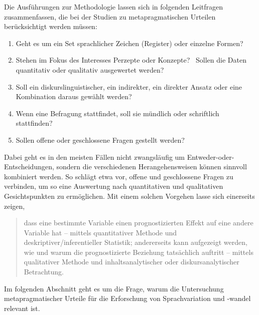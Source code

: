 Die Ausführungen zur Methodologie lassen sich in folgenden Leitfragen zusammenfassen, die bei der Studien zu metapragmatischen Urteilen berücksichtigt werden müssen:
\begin{enumerate}
\item Geht es um ein Set sprachlicher Zeichen (Register) oder einzelne Formen?
\item Stehen im Fokus des Interesses Perzepte oder Konzepte? 
\ Sollen die Daten quantitativ oder qualitativ ausgewertet werden? 
\item Soll ein diskurslinguistischer, ein indirekter, ein direkter Ansatz oder eine Kombination daraus gewählt werden? 
\item Wenn eine Befragung stattfindet, soll sie mündlich oder schriftlich stattfinden? 
\item Sollen offene oder geschlossene Fragen gestellt werden? 
\end{enumerate} 
Dabei geht es in den meisten Fällen nicht zwangsläufig um Entweder\hyp oder\hyp Entscheidungen, sondern die verschiedenen Herangehensweisen können sinnvoll kombiniert werden. 
So schlägt etwa \citet[179]{Studler.2014} vor, offene und geschlossene Fragen zu verbinden, um so eine Auswertung nach quantitativen und qualitativen Gesichtspunkten zu ermöglichen. 
Mit einem solchen Vorgehen lasse sich einerseits zeigen, 
\begin{quote}dass eine bestimmte Variable einen prognostizierten Effekt auf eine andere Variable hat -- mittels quantitativer Methode und deskriptiver/inferentieller Statistik; andererseits kann aufgezeigt werden, wie und warum die prognostizierte Beziehung tatsächlich auftritt -- mittels qualitativer Methode und inhaltsanalytischer oder diskursanalytischer Betrachtung. \citep[179]{Studler.2014}\end{quote}
Im folgenden Abschnitt geht es um die Frage, warum die Untersuchung metapragmatischer Urteile für die Erforschung von Sprachvariation und -wandel relevant ist. 

